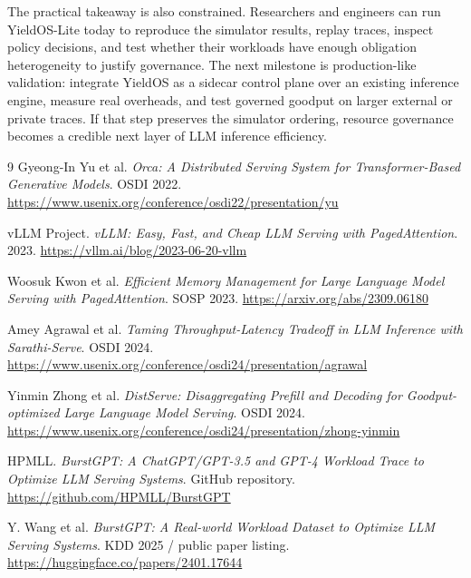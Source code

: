 \documentclass[11pt]{article}
\begin{document}
The practical takeaway is also constrained. Researchers and engineers can run YieldOS-Lite today to reproduce the simulator results, replay traces, inspect policy decisions, and test whether their workloads have enough obligation heterogeneity to justify governance. The next milestone is production-like validation: integrate YieldOS as a sidecar control plane over an existing inference engine, measure real overheads, and test governed goodput on larger external or private traces. If that step preserves the simulator ordering, resource governance becomes a credible next layer of LLM inference efficiency.

\begin{thebibliography}{9}
Gyeong-In Yu et al. \emph{Orca: A Distributed Serving System for Transformer-Based Generative Models}. OSDI 2022. \url{https://www.usenix.org/conference/osdi22/presentation/yu}

vLLM Project. \emph{vLLM: Easy, Fast, and Cheap LLM Serving with PagedAttention}. 2023. \url{https://vllm.ai/blog/2023-06-20-vllm}

Woosuk Kwon et al. \emph{Efficient Memory Management for Large Language Model Serving with PagedAttention}. SOSP 2023. \url{https://arxiv.org/abs/2309.06180}

Amey Agrawal et al. \emph{Taming Throughput-Latency Tradeoff in LLM Inference with Sarathi-Serve}. OSDI 2024. \url{https://www.usenix.org/conference/osdi24/presentation/agrawal}

Yinmin Zhong et al. \emph{DistServe: Disaggregating Prefill and Decoding for Goodput-optimized Large Language Model Serving}. OSDI 2024. \url{https://www.usenix.org/conference/osdi24/presentation/zhong-yinmin}

HPMLL. \emph{BurstGPT: A ChatGPT/GPT-3.5 and GPT-4 Workload Trace to Optimize LLM Serving Systems}. GitHub repository. \url{https://github.com/HPMLL/BurstGPT}

Y. Wang et al. \emph{BurstGPT: A Real-world Workload Dataset to Optimize LLM Serving Systems}. KDD 2025 / public paper listing. \url{https://huggingface.co/papers/2401.17644}
\end{thebibliography}
\end{document}
